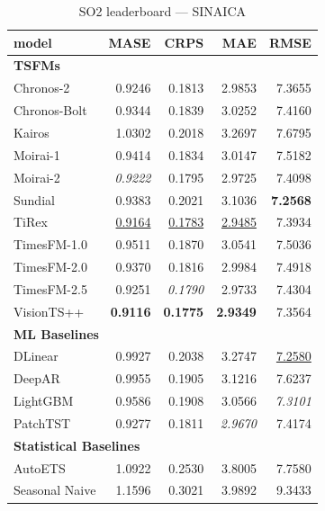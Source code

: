 \begin{table}[H]
\caption{SO2 leaderboard --- SINAICA}
\centering
\begin{small}
\begin{tabular}{lrrrr}
\toprule
model & MASE & CRPS & MAE & RMSE \\
\midrule
\multicolumn{5}{l}{\textbf{TSFMs}} \\
Chronos-2 & 0.9246 & 0.1813 & 2.9853 & 7.3655 \\
Chronos-Bolt & 0.9344 & 0.1839 & 3.0252 & 7.4160 \\
Kairos & 1.0302 & 0.2018 & 3.2697 & 7.6795 \\
Moirai-1 & 0.9414 & 0.1834 & 3.0147 & 7.5182 \\
Moirai-2 & \textit{0.9222} & 0.1795 & 2.9725 & 7.4098 \\
Sundial & 0.9383 & 0.2021 & 3.1036 & \textbf{7.2568} \\
TiRex & \underline{0.9164} & \underline{0.1783} & \underline{2.9485} & 7.3934 \\
TimesFM-1.0 & 0.9511 & 0.1870 & 3.0541 & 7.5036 \\
TimesFM-2.0 & 0.9370 & 0.1816 & 2.9984 & 7.4918 \\
TimesFM-2.5 & 0.9251 & \textit{0.1790} & 2.9733 & 7.4304 \\
VisionTS++ & \textbf{0.9116} & \textbf{0.1775} & \textbf{2.9349} & 7.3564 \\
\midrule
\multicolumn{5}{l}{\textbf{ML Baselines}} \\
DLinear & 0.9927 & 0.2038 & 3.2747 & \underline{7.2580} \\
DeepAR & 0.9955 & 0.1905 & 3.1216 & 7.6237 \\
LightGBM & 0.9586 & 0.1908 & 3.0566 & \textit{7.3101} \\
PatchTST & 0.9277 & 0.1811 & \textit{2.9670} & 7.4174 \\
\midrule
\multicolumn{5}{l}{\textbf{Statistical Baselines}} \\
AutoETS & 1.0922 & 0.2530 & 3.8005 & 7.7580 \\
Seasonal Naive & 1.1596 & 0.3021 & 3.9892 & 9.3433 \\
\bottomrule
\end{tabular}
\end{small}
\end{table}